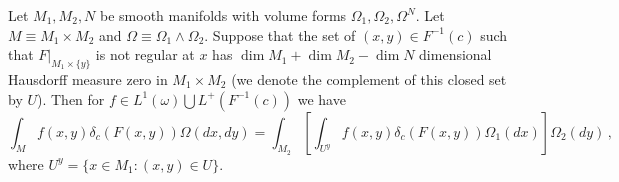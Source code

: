 \begin{theorem}
Let $M_1,M_2,N$ be smooth manifolds with volume forms $\Omega_1,\Omega_2, \Omega^N$. Let $M\equiv M_1\times M_2$ and $\Omega\equiv \Omega_1\wedge\Omega_2$. Suppose that the set of $(x,y)\in F^{-1}(c)$ such that $F|_{M_1\times\{y\}}$ is not regular at $x$ has $\dim M_1+\dim M_2-\dim N$ dimensional Hausdorff measure zero in $M_1\times M_2$ (we denote the complement of this closed set by $U$).  Then for $f\in L^1(\omega)\bigcup L^+(F^{-1}(c))$ we have
\begin{equation}\label{Fubini_eq}
\int_Mf(x,y)\delta_c(F(x,y)) \Omega(dx,dy)=\int_{M_2}\left[\int_{U^y} f(x,y) \delta_c(F(x,y))\Omega_1(dx) \right]\Omega_2(dy)\,,
\end{equation}
where $U^y=\{x\in M_1:(x,y)\in U\}$.
\end{theorem}
